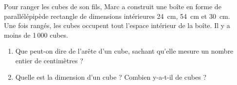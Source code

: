 
Pour ranger les cubes de son fils, Marc a construit une boîte en forme de parallélépipède rectangle de dimensions intérieures 24~cm, 54~cm et 30~cm.
\\Une fois rangés, les cubes occupent tout l'espace intérieur de la boîte. Il y a moins de 1\,000 cubes.
\begin{enumerate}
\item Que peut-on dire de l'arête d'un cube, sachant qu'elle mesure un nombre entier de centimètres ?
\item Quelle est la dimension d'un cube ? Combien y-a-t-il de cubes ?
\end{enumerate}
